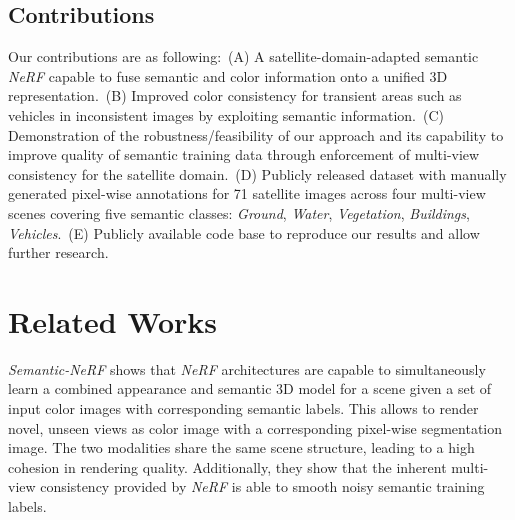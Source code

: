 \subsection{Contributions}
Our contributions are as following:~(A) A satellite-domain-adapted semantic \emph{NeRF} capable to fuse semantic and color information onto a unified 3D representation.~(B) Improved color consistency for transient areas such as vehicles in inconsistent images by exploiting semantic information.~(C) Demonstration of the robustness/feasibility of our approach and its capability to improve quality of semantic training data through enforcement of multi-view consistency for the satellite domain.~(D) Publicly released dataset with manually generated pixel-wise annotations for 71 satellite images across four multi-view scenes covering five semantic classes: \emph{Ground}, \emph{Water}, \emph{Vegetation}, \emph{Buildings}, \emph{Vehicles}.~(E) Publicly available code base to reproduce our results and allow further research.








\section{Related Works}



\emph{Semantic-NeRF} \cite{semanticnerf} shows that \emph{NeRF} architectures are capable to simultaneously learn a combined appearance and semantic 3D model for a scene given a set of input color images with corresponding semantic labels.
This allows to render novel, unseen views as color image with a corresponding pixel-wise segmentation image.
The two modalities share the same scene structure, leading to a high cohesion in rendering quality. 
Additionally, they show that the inherent multi-view consistency provided by \emph{NeRF} is able to smooth noisy semantic training labels.





